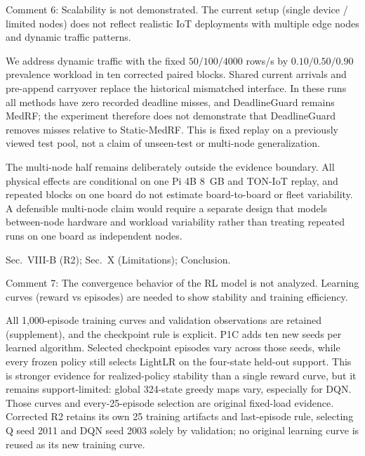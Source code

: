 \documentclass[10pt,a4paper]{article}
\begin{document}
\begin{rcommentbox}
Comment 6: Scalability is not demonstrated. The current setup (single device / limited nodes) does not reflect realistic IoT deployments with multiple edge nodes and dynamic traffic patterns.
\end{rcommentbox}

\begin{authorresponsebox}
We address dynamic traffic with the fixed $50/100/4000$ rows/s by $0.10/0.50/0.90$ prevalence workload in ten corrected paired blocks. Shared current arrivals and pre-append carryover replace the historical mismatched interface. In these runs all methods have zero recorded deadline misses, and DeadlineGuard remains MedRF; the experiment therefore does not demonstrate that DeadlineGuard removes misses relative to Static-MedRF. This is fixed replay on a previously viewed test pool, not a claim of unseen-test or multi-node generalization.

The multi-node half remains deliberately outside the evidence boundary. All physical effects are conditional on one Pi 4B 8~GB and TON-IoT replay, and repeated blocks on one board do not estimate board-to-board or fleet variability. A defensible multi-node claim would require a separate design that models between-node hardware and workload variability rather than treating repeated runs on one board as independent nodes.
\end{authorresponsebox}

\begin{wherebox}
Sec.~VIII-B (R2); Sec.~X (Limitations); Conclusion.
\end{wherebox}

\begin{rcommentbox}
Comment 7: The convergence behavior of the RL model is not analyzed. Learning curves (reward vs episodes) are needed to show stability and training efficiency.
\end{rcommentbox}

\begin{authorresponsebox}
All 1{,}000-episode training curves and validation observations are retained (supplement), and the checkpoint rule is explicit. P1C adds ten new seeds per learned algorithm. Selected checkpoint episodes vary across those seeds, while every frozen policy still selects LightLR on the four-state held-out support. This is stronger evidence for realized-policy stability than a single reward curve, but it remains support-limited: global 324-state greedy maps vary, especially for DQN. Those curves and every-25-episode selection are original fixed-load evidence. Corrected R2 retains its own 25 training artifacts and last-episode rule, selecting Q seed 2011 and DQN seed 2003 solely by validation; no original learning curve is reused as its new training curve.
\end{authorresponsebox}
\end{document}
